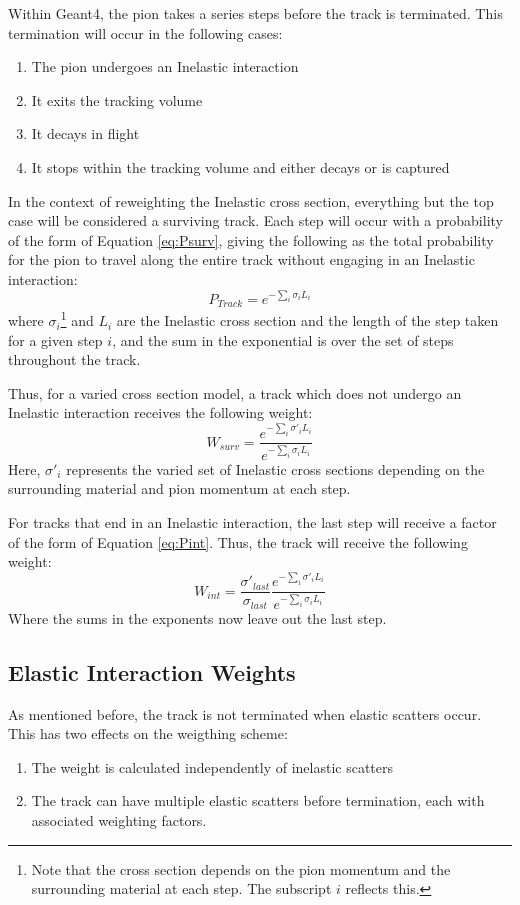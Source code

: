 \documentclass[12pt]{article}
\begin{document}
Within Geant4, the pion takes a series steps before the track is terminated. This termination will occur in the following cases:
\begin{enumerate}
\item The pion undergoes an Inelastic interaction
\item It exits the tracking volume
\item It decays in flight
\item It stops within the tracking volume and either decays or is captured
\end{enumerate}
In the context of reweighting the Inelastic cross section, everything but the top case will be considered a surviving track.
Each step will occur with a probability of the form of Equation \ref{eq:Psurv}, giving the following as the total probability for the pion to travel along the entire track without engaging in an Inelastic interaction:
\begin{equation}
P_{Track} =  e^{- \sum \limits_{i} \sigma_i L_i}
\end{equation} 
where $\sigma_i$\footnote{Note that the cross section depends on the pion momentum and the surrounding material at each step. The subscript $i$ reflects this.} and $L_i$ are the Inelastic cross section and the length of the step taken for a given step $i$, and the sum in the exponential is over the set of steps throughout the track.

Thus, for a varied cross section model, a track which does not undergo an Inelastic interaction receives the following weight:
\begin{equation}\label{eq:surv_weight}
  W_{surv} = \frac{e^{- \sum \limits_{i} \sigma'_i L_i}}{e^{- \sum \limits_{i} \sigma_i L_i}}
\end{equation}
Here, $\sigma'_i$ represents the varied set of Inelastic cross sections depending on the surrounding material and pion momentum at each step.

For tracks that end in an Inelastic interaction, the last step will receive a factor of the form of Equation \ref{eq:Pint}. Thus, the track will receive the following weight: 
\begin{equation}\label{eq:int_weight}
  W_{int} = \frac{\sigma'_{last}}{\sigma_{last}} \frac{e^{- \sum \limits_{i} \sigma'_i L_i}}{e^{- \sum \limits_{i} \sigma_i L_i}}
\end{equation}
Where the sums in the exponents now leave out the last step.

\subsection{Elastic Interaction Weights}
As mentioned before, the track is not terminated when elastic scatters occur. This has two effects on the weigthing scheme:
\begin{enumerate}
\item The weight is calculated independently of inelastic scatters
\item The track can have multiple elastic scatters before termination, each with associated weighting factors. 
\end{enumerate}
\end{document}

